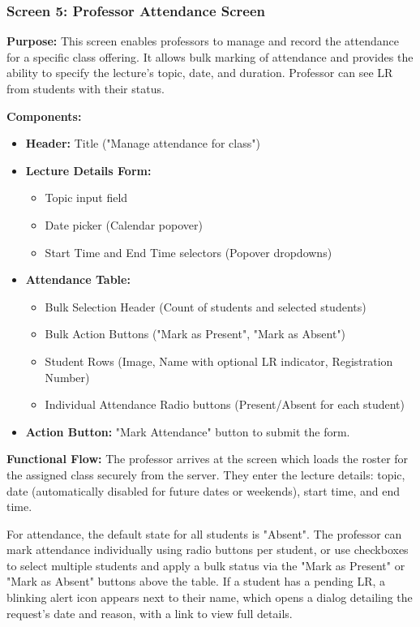 
\subsubsection{Screen 5: Professor Attendance Screen}

\textbf{Purpose:}
This screen enables professors to manage and record the attendance for a specific class offering. It allows bulk marking of attendance and provides the ability to specify the lecture's topic, date, and duration. Professor can see LR from students with their status.

\textbf{Components:} \begin{itemize} \item \textbf{Header:} Title ("Manage attendance for class") \item \textbf{Lecture Details Form:} \begin{itemize} \item Topic input field \item Date picker (Calendar popover) \item Start Time and End Time selectors (Popover dropdowns) \end{itemize} \item \textbf{Attendance Table:} \begin{itemize} \item Bulk Selection Header (Count of students and selected students) \item Bulk Action Buttons ("Mark as Present", "Mark as Absent") \item Student Rows (Image, Name with optional LR indicator, Registration Number) \item Individual Attendance Radio buttons (Present/Absent for each student) \end{itemize} \item \textbf{Action Button:} "Mark Attendance" button to submit the form. \end{itemize}

\textbf{Functional Flow:} The professor arrives at the screen which loads the roster for the assigned class securely from the server. They enter the lecture details: topic, date (automatically disabled for future dates or weekends), start time, and end time.

For attendance, the default state for all students is "Absent". The professor can mark attendance individually using radio buttons per student, or use checkboxes to select multiple students and apply a bulk status via the "Mark as Present" or "Mark as Absent" buttons above the table. If a student has a pending LR, a blinking alert icon appears next to their name, which opens a dialog detailing the request's date and reason, with a link to view full details.


